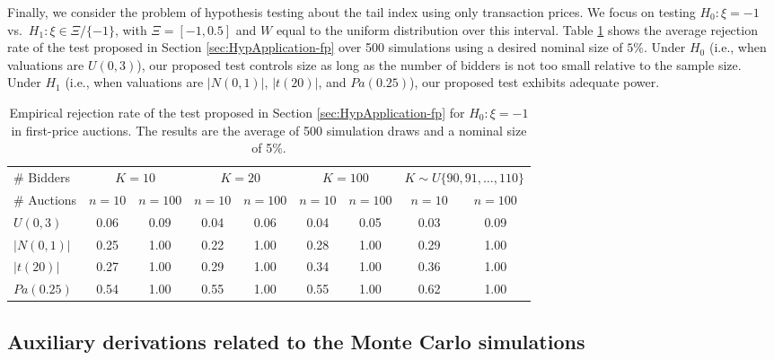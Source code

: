 Finally, we consider the problem of hypothesis testing about the tail index using only transaction prices. We focus on testing $H_0:\xi = -1$ vs.\ $H_1:\xi \in \Xi/\{-1\}$, with $\Xi =[-1,0.5] $ and $W$ equal to the uniform distribution over this interval. Table \ref{tbl:fp-test} shows the average rejection rate of the test proposed in Section \ref{sec:HypApplication-fp} over 500 simulations using a desired nominal size of $5\%$. Under $H_0$ (i.e., when valuations are $U(0,3)$), our proposed test controls size as long as the number of bidders is not too small relative to the sample size. Under $H_1$ (i.e., when valuations are $\vert N(0,1) \vert$, $\vert t(20) \vert$, and $Pa(0.25)$), our proposed test exhibits adequate power.


\begin{table}[ht]
\centering
\renewcommand{\arraystretch}{1.5}
\begin{tabular}{lcccccccc}
\hline\hline
\# Bidders & \multicolumn{2}{c}{$K=10$}   & \multicolumn{2}{c}{$K=20$}   & \multicolumn{2}{c}{$K=100$} & \multicolumn{2}{c}{ $K\sim U\{90,91,\dots,110 \}$  } \\ 
\# Auctions & $n=10$ & $n  = 100$   & $n=10$ & $n  = 100$   & $n=10$ & $n  = 100$  & $n=10$ & $n  = 100$\\ \hline
$U(0,3)$               & 0.06 & 0.09 &  0.04 & 0.06 &  0.04 & 0.05  &  0.03 & 0.09 \\ 
{$\vert N(0,1) \vert$} & 0.25 & 1.00 &   0.22 & 1.00 &  0.28 & 1.00  &  0.29	& 1.00 \\ 
{$\vert t(20) \vert$}  & 0.27 & 1.00 &   0.29 & 1.00 &  0.34 & 1.00  &  0.36 & 1.00 \\ 
$Pa(0.25) $            & 0.54 & 1.00 &   0.55 & 1.00 &  0.55 & 1.00  &  0.62 & 1.00 \\ 
\hline\hline
\end{tabular}
\caption{Empirical rejection rate of the test proposed in Section \ref{sec:HypApplication-fp} for $H_0:\xi = -1$ in first-price auctions. The results are the average of 500 simulation draws and a nominal size of 5\%.}\label{tbl:fp-test}
\end{table}


\subsection{Auxiliary derivations related to the Monte Carlo simulations}\label{sec:appendix-MC}

